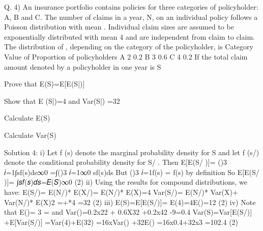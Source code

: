 Q. 4) An insurance portfolio contains policies for three categories of policyholder: A, B and C.
The number of claims in a year, N, on an individual policy follows a Poisson distribution
with mean \lambda. Individual claim sizes are assumed to be exponentially distributed with mean
4 and are independent from claim to claim. The distribution of \lambda, depending on the
category of the policyholder, is
Category Value of \lambda Proportion of policyholders
A 2 0.2
B 3 0.6
C 4 0.2
If the total claim amount denoted by a policyholder in one year is S
\item Prove that E(S)=E[E(S|\lambda)] 
\item Show that E (S|\lambda)=4 \lambda and Var(S|\lambda) =32 \lambda 
\item Calculate E(S) 
\item Calculate Var(S) 


Solution 4:
i)
Let f (s) denote the marginal probability density for S and let f (s/\lambda) denote the conditional probability density for S/ \lambda. Then
E[E(S/ \lambda)]= ()3
𝑖=1∫sf(s\lambda)ds∞0
=∫()3
𝑖=1∞0 sf(s\lambda)ds
But ()3
𝑖=1f(s\lambda) = f(s) by definition
So
E[E(S/ \lambda)]= ∫𝑠𝑓(𝑠)𝑑𝑠=𝐸(𝑆)∞0
(2)
ii)
Using the results for compound distributions, we have:
E(S/\lambda)= E(N/\lambda)* E(X/\lambda)= E(N/\lambda)* E(X)=4\lambda
Var(S/\lambda)= E(N/\lambda)* Var(X)+ Var(N/\lambda)* E(X)2
=+*4
=32\lambda
(2)
iii)
E(S)=E[E(S/\lambda)]= E(4\lambda)=4E(\lambda)=12
(2)
iv)
Note that E(\lambda)= 3 \lambda = and
Var(\lambda)=0.2x22 + 0.6X32 +0.2x42 -9=0.4
Var(S)=Var[E(S/\lambda)] +E[Var(S/\lambda)]
=Var(4\lambda)+E(32\lambda)
=16xVar(\lambda) +32E(\lambda)
=16x0.4+32x3
=102.4
(2)

